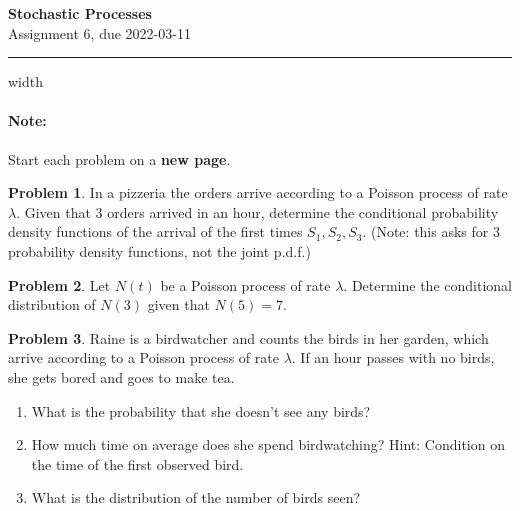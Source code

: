\documentclass{article}
\theoremstyle{definition}
\newtheorem{problem}{Problem}
\begin{document}
\thispagestyle{crfooter}

\begin{center}
  {\LARGE \textbf{Stochastic Processes}} \\ \medskip
  {\Large Assignment 6, due 2022-03-11}
\end{center}

\hrule width \textwidth

\paragraph{Note:} Start each problem on a \textbf{new page}.%


\begin{problem}
  In a pizzeria the orders arrive according to a Poisson process of rate $\lambda$. Given that 3 orders arrived in an hour, determine the conditional probability density functions of the arrival of the first times $S_1,S_2,S_3$.
  (Note: this asks for 3 probability density functions, not the joint p.d.f.)
\end{problem}


\begin{problem}
  Let $N(t)$ be a Poisson process of rate $\lambda$.
  Determine the conditional distribution of $N(3)$ given that $N(5)=7$.
\end{problem}


\begin{problem}
  Raine is a birdwatcher and counts the birds in her garden, which arrive according to a Poisson process of rate $\lambda$.
  If an hour passes with no birds, she gets bored and goes to make tea.
  \begin{enumerate}
  \item What is the probability that she doesn't see any birds?
  \item How much time on average does she spend birdwatching?
    Hint: Condition on the time of the first observed bird.
  \item What is the distribution of the number of birds seen?
  \end{enumerate}
\end{problem}
\end{document}
